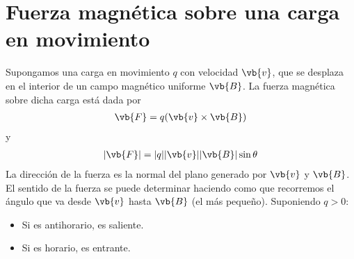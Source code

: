 \documentclass{./FisicaII.tex}
\begin{document}
\section{Fuerza magnética sobre una carga en movimiento}
Supongamos una carga en movimiento \(q\) con velocidad \(\vb{v}\), que se desplaza
en el interior de un campo magnético uniforme \(\vb{B}\). La fuerza magnética sobre
dicha carga está dada por
\begin{equation}
    \begin{split}
        \vb{F} = q (\vb{v} \times \vb{B})
    \end{split}
\end{equation}
y
\begin{equation}
    \begin{split}
        |\vb{F}| = |q| |\vb{v}| |\vb{B}| \sin \theta 
    \end{split}
\end{equation}
La dirección de la fuerza es la normal del plano generado por \(\vb{v}\) y \(\vb{B}\).
El sentido de la fuerza se puede determinar haciendo como que recorremos el ángulo
que va desde \(\vb{v}\) hasta \(\vb{B}\) (el más pequeño). Suponiendo \(q > 0\):
\begin{itemize}
    \item Si es antihorario, es saliente.
    \item Si es horario, es entrante.
\end{itemize}
\end{document}
